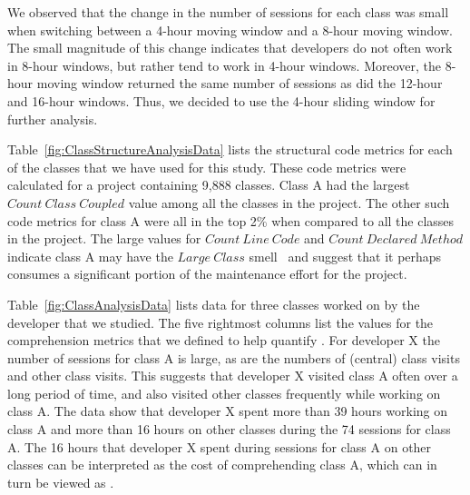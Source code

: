 We observed that the change in the number of sessions for each class was small when switching between a 4-hour moving window and a 8-hour moving window. The small magnitude of this change indicates that developers do not often work in 8-hour windows, but rather tend to work in 4-hour windows. Moreover, the 8-hour moving window returned the same number of sessions as did the 12-hour and 16-hour windows. Thus, we decided to use the 4-hour sliding window for further analysis.

Table~\ref{fig:ClassStructureAnalysisData} lists the structural code metrics for each of the classes that we have used for this study.  These code metrics were calculated for a project containing 9,888 classes. Class A had the largest $Count~Class~Coupled$ value among all the classes in the project. The other such code metrics for class A were all in the top 2\% when compared to all the classes in the project.
The large values for $Count~Line~Code$ and $Count~Declared~Method$ indicate class A may have the $Large~Class$ smell~\cite{Fowler_etal:1999} and suggest that it perhaps consumes a significant portion of the maintenance effort for the project. 

Table~\ref{fig:ClassAnalysisData} lists data for three classes worked on by the developer that we studied. The five rightmost columns list the values for the comprehension metrics that we defined to help quantify \TD. For developer X the number of sessions for class A is large, as are the numbers of (central) class visits and other class visits. This suggests that developer X visited class A often over a long period of time, and also visited other classes frequently while working on class A. The data show that developer X spent more than 39 hours working on class A and more than 16 hours on other classes during the 74 sessions for class A. The 16 hours that developer X spent during sessions for class A on other classes can be interpreted as the cost of comprehending class A, which can in turn be viewed as \TD.

